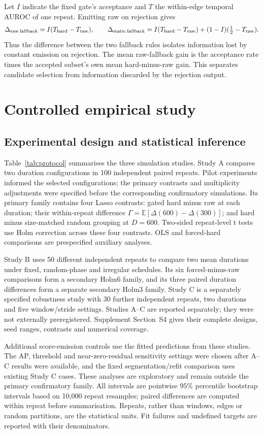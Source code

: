 \documentclass[11pt]{article}
\begin{document}
Let $I$ indicate the fixed gate's acceptance and $T$ the within-edge
temporal AUROC of one repeat. Emitting raw on rejection gives
\begin{equation}
\Delta_{\rm raw\,fallback}=I(T_{\rm hard}-T_{\rm raw}),\qquad
\Delta_{\rm static\,fallback}=I(T_{\rm hard}-T_{\rm raw})
 +(1-I)(\tfrac12-T_{\rm raw}).
\label{eq:fallback-decomposition}
\end{equation}
Thus the difference between the two fallback rules isolates information lost
by constant emission on rejection. The mean raw-fallback gain is the acceptance
rate times the accepted subset's own mean hard-minus-raw gain. This separates
candidate selection from information discarded by the rejection output.

\section{Controlled empirical study}
\label{sec:empirical}
\subsection{Experimental design and statistical inference}
Table~\ref{tab:protocol} summarises the three simulation studies. Study A
compares two duration configurations in 100 independent paired repeats.
Pilot experiments informed the selected configurations; the primary contrasts
and multiplicity adjustments were specified before the corresponding
confirmatory simulations. Its primary family contains four Lasso contrasts:
gated hard minus raw at each duration; their within-repeat difference
$\Gamma=\mathbb E[\Delta(600)-\Delta(300)]$; and hard minus size-matched
random grouping at $D=600$. Two-sided repeat-level t tests use Holm correction
across these four contrasts. OLS and forced-hard comparisons are prespecified
auxiliary analyses.

Study B uses 50 different independent repeats to compare two mean durations
under fixed, random-phase and irregular schedules. Its six forced-minus-raw
comparisons form a secondary Holm6 family, and its three paired duration
differences form a separate secondary Holm3 family. Study C is a separately
specified robustness study with 30 further independent repeats, two durations
and five window/stride settings. Studies A--C are reported separately; they
were not externally preregistered. Supplement Section~S4 gives their complete
designs, seed ranges, contrasts and numerical coverage.

Additional score-emission controls use the fitted predictions from these
studies. The AP, threshold and near-zero-residual sensitivity settings were
chosen after A--C results were available, and the fixed segmentation/refit
comparison uses existing Study C cases. These analyses are exploratory and
remain outside the primary confirmatory family. All intervals are pointwise
$95\%$ percentile bootstrap intervals based on 10,000 repeat resamples;
paired differences are computed within repeat before summarisation. Repeats,
rather than windows, edges or random partitions, are the statistical units.
Fit failures and undefined targets are reported with their denominators.
\end{document}
